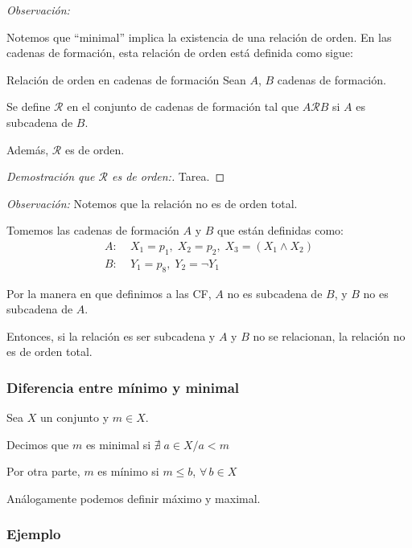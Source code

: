 \medskip
\textit{Observación:}

Notemos que ``minimal'' implica la existencia de una relación de orden. En las
cadenas de formación, esta relación de orden está definida como sigue:

\medskip

\begin{definicion}{Relación de orden en cadenas de formación}{}
Sean $A$, $B$ cadenas de formación.

\medskip

Se define $\mathcal{R}$ en el conjunto de cadenas de formación tal que
$A \mathcal{R} B$ si $A$ es subcadena de $B$.

Además, $\mathcal{R}$ es de orden.
\end{definicion}

\begin{proof}[Demostración que $\mathcal{R}$ es de orden:] Tarea.
\end{proof}

\textit{Observación:}
Notemos que la relación no es de orden total.

Tomemos las cadenas de formación $A$ y $B$ que están definidas como:
\begin{align*}
    A:& \; X_1 = p_1, \; X_2 = p_2, \; X_3 = (X_1 \wedge X_2) \\
    B:& \; Y_1 = p_8, \; Y_2 = \neg Y_1
\end{align*}

Por la manera en que definimos a las CF, $A$ no es subcadena de $B$, y $B$ no 
es subcadena de $A$.

Entonces, si la relación es ser subcadena y $A$ y $B$ no se relacionan, la 
relación no es de orden total.


\subsubsection{Diferencia entre mínimo y minimal}

Sea $X$ un conjunto y $m \in X$.

Decimos que $m$ es minimal si $\nexists \; a \in X / a < m$

Por otra parte, $m$ es mínimo si $m \leq b$, $\forall \, b \in X$

Análogamente podemos definir máximo y maximal.

\subsubsection{Ejemplo}

